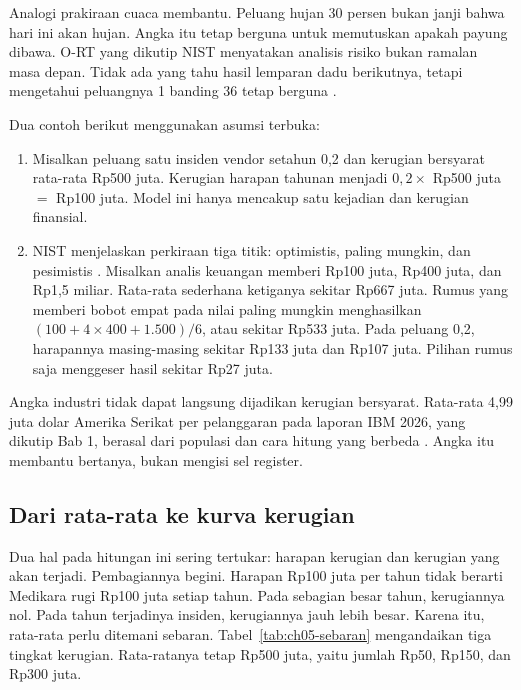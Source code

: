 Analogi prakiraan cuaca membantu. Peluang hujan 30 persen bukan janji bahwa hari ini akan hujan.
Angka itu tetap berguna untuk memutuskan apakah payung dibawa. O-RT yang dikutip NIST menyatakan
analisis risiko bukan ramalan masa depan. Tidak ada yang tahu hasil lemparan dadu berikutnya, tetapi
mengetahui peluangnya 1 banding 36 tetap berguna \cite{c05-nist-ir8286ar1}.

Dua contoh berikut menggunakan asumsi terbuka:
\begin{enumerate}
  \item Misalkan peluang satu insiden vendor setahun 0,2 dan kerugian bersyarat rata-rata Rp500 juta.
  Kerugian harapan tahunan menjadi $0{,}2 \times$ Rp500 juta $=$ Rp100 juta. Model ini hanya mencakup
  satu kejadian dan kerugian finansial.
  \item NIST menjelaskan perkiraan tiga titik: optimistis, paling mungkin, dan pesimistis
  \cite{c05-nist-ir8286ar1}. Misalkan analis keuangan memberi Rp100 juta, Rp400 juta, dan Rp1,5 miliar.
  Rata-rata sederhana ketiganya sekitar Rp667 juta. Rumus yang memberi bobot empat pada nilai paling
  mungkin menghasilkan $(100 + 4 \times 400 + 1.500) / 6$, atau sekitar Rp533 juta. Pada peluang 0,2,
  harapannya masing-masing sekitar Rp133 juta dan Rp107 juta. Pilihan rumus saja menggeser hasil
  sekitar Rp27 juta.
\end{enumerate}

Angka industri tidak dapat langsung dijadikan kerugian bersyarat. Rata-rata 4,99 juta dolar Amerika
Serikat per pelanggaran pada laporan IBM 2026, yang dikutip Bab 1, berasal dari populasi dan cara
hitung yang berbeda \cite{ibm-cdb2026}. Angka itu membantu bertanya, bukan mengisi sel register.

\subsection*{Dari rata-rata ke kurva kerugian}

Dua hal pada hitungan ini sering tertukar: harapan kerugian dan kerugian yang akan terjadi.
Pembagiannya begini. Harapan Rp100 juta per tahun tidak berarti Medikara rugi Rp100 juta setiap
tahun. Pada sebagian besar tahun, kerugiannya nol. Pada tahun terjadinya insiden, kerugiannya jauh
lebih besar. Karena itu, rata-rata perlu ditemani sebaran. Tabel~\ref{tab:ch05-sebaran} mengandaikan
tiga tingkat kerugian. Rata-ratanya tetap Rp500 juta, yaitu jumlah Rp50, Rp150, dan Rp300 juta.

